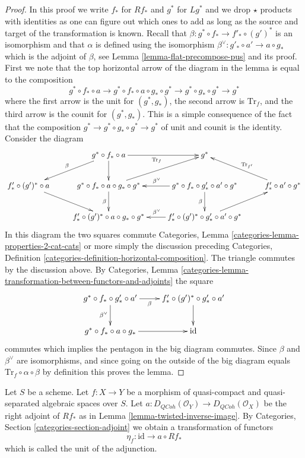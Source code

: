 \documentclass{stacks-project}
\theoremstyle{plain}
\theoremstyle{definition}
\theoremstyle{remark}
\numberwithin{equation}{subsection}
\def\QCoh{\mathit{QCoh}}
\begin{document}
\begin{proof}
In this proof we write $f_*$ for $Rf_*$ and $g^*$ for $Lg^*$ and we
drop $\star$ products with identities as one can figure out which ones
to add as long as the source and target of the transformation is known.
Recall that $\beta : g^* \circ f_* \to f'_* \circ (g')^*$ is an isomorphism
and that $\alpha$ is defined using
the isomorphism $\beta^\vee : g'_* \circ a' \to a \circ g_*$
which is the adjoint of $\beta$, see Lemma \ref{lemma-flat-precompose-pus}
and its proof. First we note that the top horizontal arrow
of the diagram in the lemma is equal to the composition
$$
g^* \circ f_* \circ a \to
g^* \circ f_* \circ a \circ g_* \circ g^* \to
g^* \circ g_* \circ g^* \to g^*
$$
where the first arrow is the unit for $(g^*, g_*)$, the second arrow
is $\text{Tr}_f$, and the third arrow is the counit for $(g^*, g_*)$.
This is a simple consequence of the fact that the composition
$g^* \to g^* \circ g_* \circ g^* \to g^*$ of unit and counit is the identity.
Consider the diagram
$$
\xymatrix{
& g^* \circ f_* \circ a \ar[ld]_\beta \ar[d] \ar[r]_{\text{Tr}_f} & g^* \\
f'_* \circ (g')^* \circ a \ar[dr] &
g^* \circ f_* \circ a \circ g_* \circ g^* \ar[d]_\beta \ar[ru] &
g^* \circ f_* \circ g'_* \circ a' \circ g^* \ar[l]_{\beta^\vee} \ar[d]_\beta &
f'_* \circ a' \circ g^* \ar[lu]_{\text{Tr}_{f'}} \\
& f'_* \circ (g')^* \circ a \circ g_* \circ g^* &
f'_* \circ (g')^* \circ g'_* \circ a' \circ g^* \ar[ru] \ar[l]_{\beta^\vee}
}
$$
In this diagram the two squares commute 
Categories, Lemma \ref{categories-lemma-properties-2-cat-cats}
or more simply the discussion preceding
Categories, Definition \ref{categories-definition-horizontal-composition}.
The triangle commutes by the discussion above. By
Categories, Lemma
\ref{categories-lemma-transformation-between-functors-and-adjoints}
the square
$$
\xymatrix{
g^* \circ f_* \circ g'_* \circ a' \ar[d]_{\beta^\vee} \ar[r]_-\beta &
f'_* \circ (g')^* \circ g'_* \circ a' \ar[d] \\
g^* \circ f_* \circ a \circ g_* \ar[r] &
\text{id}
}
$$
commutes which implies the pentagon in the big diagram commutes.
Since $\beta$ and $\beta^\vee$ are isomorphisms, and since going on
the outside of the big diagram equals
$\text{Tr}_f \circ \alpha \circ \beta$ by definition this proves the lemma.
\end{proof}

\noindent
Let $S$ be a scheme.
Let $f : X \to Y$ be a morphism of quasi-compact and quasi-separated
algebraic spaces over $S$.
Let $a : D_\QCoh(\mathcal{O}_Y) \to D_\QCoh(\mathcal{O}_X)$
be the right adjoint of $Rf_*$ as in
Lemma \ref{lemma-twisted-inverse-image}. By
Categories, Section \ref{categories-section-adjoint} we obtain a
transformation of functors
$$
\eta_f : \text{id} \to  a \circ Rf_*
$$
which is called the unit of the adjunction.
\end{document}
